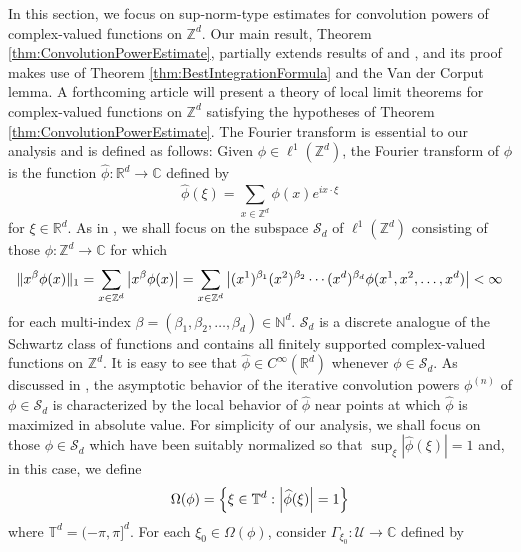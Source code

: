 \documentclass[11pt, letter]{book}
\begin{document}
\noindent In this section, we focus on sup-norm-type estimates for convolution powers of complex-valued functions on $\mathbb{Z}^d$. Our main result, Theorem \ref{thm:ConvolutionPowerEstimate}, partially extends results of \cite{randles_convolution_2015} and \cite{randles_convolution_2017}, and its proof makes use of Theorem \ref{thm:BestIntegrationFormula} and the Van der Corput lemma. A forthcoming article will present a theory of local limit theorems for complex-valued functions on $\mathbb{Z}^d$ satisfying the hypotheses of Theorem \ref{thm:ConvolutionPowerEstimate}. The Fourier transform is essential to our analysis and is defined as follows: Given $\phi\in\ell^1(\mathbb{Z}^d)$, the Fourier transform of $\phi$ is the function $\widehat{\phi}:\mathbb{R}^d\to\mathbb{C}$ defined by
\begin{equation*}
    \widehat{\phi}(\xi)=\sum_{x\in\mathbb{Z}^d}\phi(x)e^{ix\cdot\xi}
\end{equation*}
for $\xi\in\mathbb{R}^d$. As in \cite{randles_convolution_2017}, we shall focus on the subspace $\mathcal{S}_d$ of $\ell^1(\mathbb{Z}^d)$ consisting of those $\phi:\mathbb{Z}^d\to\mathbb{C}$ for which
\begin{equation*}
    \|x^\beta \phi(x)\|_1=\sum_{x\in\mathbb{Z}^d}\abs{x^\beta\phi(x)}=\sum_{x\in\mathbb{Z}^d}\abs{(x^1)^{\beta_1}(x^2)^{\beta_2}\cdots(x^d)^{\beta_d}\phi(x^1,x^2,\dots,x^d)}<\infty
\end{equation*}
for each multi-index $\beta=(\beta_1,\beta_2,\dots,\beta_d)\in\mathbb{N}^d$. $\mathcal{S}_d$ is a discrete analogue of the Schwartz class of functions and contains all finitely supported complex-valued functions on $\mathbb{Z}^d$.  It is easy to see that $\widehat{\phi}\in C^\infty(\mathbb{R}^d)$ whenever $\phi\in \mathcal{S}_d$. As discussed in \cite{thomee_stability_1965,diaconis_convolution_2014,randles_convolution_2015,randles_convolution_2017}, the asymptotic behavior of the iterative convolution powers $\phi^{(n)}$ of $\phi\in\mathcal{S}_d$ is characterized by the local behavior of $\widehat{\phi}$ near points at which $\widehat{\phi}$ is maximized in absolute value. For simplicity of our analysis, we shall focus on those $\phi\in\mathcal{S}_d$ which have been suitably normalized so that $\sup_{\xi}|\widehat{\phi}(\xi)|=1$ and, in this case, we define
\begin{equation*}
    \Omega(\phi)=\left\{\xi\in \mathbb{T}^d:\abs{\widehat{\phi}(\xi)}=1\right\}
\end{equation*}
where $\mathbb{T}^d=(-\pi,\pi]^d$. For each $\xi_0\in \Omega(\phi)$, consider $\Gamma_{\xi_0}:\mathcal{U}\to\mathbb{C}$ defined by
\end{document}
